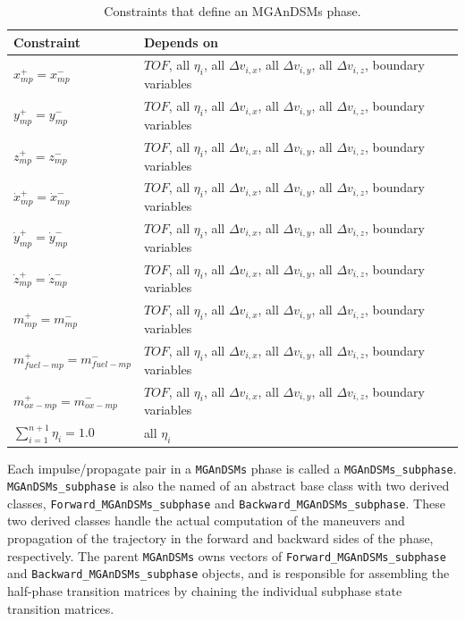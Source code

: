 \begin{table}
	\centering
	\caption{Constraints that define an \ac{MGAnDSMs} phase.}
	\label{tab:constraints_MGAnDSMs}
	\begin{tabular}{ll}
		\hline\hline
		Constraint & Depends on\\
		\hline		
		$x^+_{mp} = x^-_{mp}$& $TOF$, all $\eta_i$, all $\Delta v_{i,x}$, all $\Delta v_{i,y}$, all $\Delta v_{i,z}$, boundary variables\\
		$y^+_{mp} = y^-_{mp}$& $TOF$, all $\eta_i$, all $\Delta v_{i,x}$, all $\Delta v_{i,y}$, all $\Delta v_{i,z}$, boundary variables\\
		$z^+_{mp} = z^-_{mp}$& $TOF$, all $\eta_i$, all $\Delta v_{i,x}$, all $\Delta v_{i,y}$, all $\Delta v_{i,z}$, boundary variables\\
		$\dot{x}^+_{mp} = \dot{x}^-_{mp}$& $TOF$, all $\eta_i$, all $\Delta v_{i,x}$, all $\Delta v_{i,y}$, all $\Delta v_{i,z}$, boundary variables\\
		$\dot{y}^+_{mp} = \dot{y}^-_{mp}$& $TOF$, all $\eta_i$, all $\Delta v_{i,x}$, all $\Delta v_{i,y}$, all $\Delta v_{i,z}$, boundary variables\\
		$\dot{z}^+_{mp} = \dot{z}^-_{mp}$& $TOF$, all $\eta_i$, all $\Delta v_{i,x}$, all $\Delta v_{i,y}$, all $\Delta v_{i,z}$, boundary variables\\
		$m^+_{mp} = m^-_{mp}$& $TOF$, all $\eta_i$, all $\Delta v_{i,x}$, all $\Delta v_{i,y}$, all $\Delta v_{i,z}$, boundary variables\\
		$m^+_{fuel-mp} = m^-_{fuel-mp}$& $TOF$, all $\eta_i$, all $\Delta v_{i,x}$, all $\Delta v_{i,y}$, all $\Delta v_{i,z}$, boundary variables\\
		$m^+_{ox-mp} = m^-_{ox-mp}$& $TOF$, all $\eta_i$, all $\Delta v_{i,x}$, all $\Delta v_{i,y}$, all $\Delta v_{i,z}$, boundary variables\\
		$\sum_{i=1}^{n+1} \eta_i = 1.0$ & all $\eta_i$\\
		\hline\hline		
	\end{tabular}
\end{table}

Each impulse/propagate pair in a \texttt{MGAnDSMs} phase is called a \texttt{MGAnDSMs\_subphase}. \texttt{MGAnDSMs\_subphase} is also the named of an abstract base class with two derived classes, \texttt{Forward\_MGAnDSMs\_subphase} and \texttt{Backward\_MGAnDSMs\_subphase}. These two derived classes handle the actual computation of the maneuvers and propagation of the trajectory in the forward and backward sides of the phase, respectively. The parent \texttt{MGAnDSMs} owns vectors of \texttt{Forward\_MGAnDSMs\_subphase} and \texttt{Backward\_MGAnDSMs\_subphase} objects, and is responsible for assembling the half-phase transition matrices by chaining the individual subphase state transition matrices.


